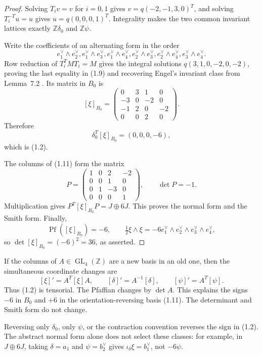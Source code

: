 \documentclass[11pt]{article}
\numberwithin{equation}{section}
\begin{document}
\begin{proof}
Solving $T_iv=v$ for $i=0,1$ gives
$v=q(-2,-1,3,0)^T$, and solving $T_i^{-T}u=u$ gives
$u=q(0,0,0,1)^T$.  Integrality makes the two common invariant lattices
exactly $\mathbb Z\delta_0$ and $\mathbb Z\psi$.

Write the coefficients of an alternating form in the order
\[
 e_1^\vee\wedge e_2^\vee, e_1^\vee\wedge e_3^\vee,
 e_1^\vee\wedge e_4^\vee, e_2^\vee\wedge e_3^\vee,
 e_2^\vee\wedge e_4^\vee, e_3^\vee\wedge e_4^\vee.
\]
Row reduction of $T_i^TMT_i=M$ gives the integral solutions
$q(3,1,0,-2,0,-2)$, proving the last equality in (1.9) and recovering
Engel's invariant class from Lemma~7.2 \cite[p.~17]{Engel}.  Its matrix in
$B_0$ is
\[
 [\xi]_{B_0}=
 \begin{pmatrix}
 0&3&1&0\\-3&0&-2&0\\-1&2&0&-2\\0&0&2&0
 \end{pmatrix}.                                                   \tag{1.14}
\]
Therefore
\[
       \delta_0^T[\xi]_{B_0}=(0,0,0,-6),
\]
which is (1.2).

The columns of (1.11) form the matrix
\[
 P=\begin{pmatrix}1&0&2&-2\\0&0&1&0\\0&1&-3&0\\0&0&0&1\end{pmatrix},
 \qquad \det P=-1.
\]
Multiplication gives $P^T[\xi]_{B_0}P=J\oplus6J$.  This proves the
normal form and the Smith form.  Finally,
\[
 \operatorname{Pf}([\xi]_{B_0})=-6,\qquad
 \tfrac12\xi\wedge\xi
   =-6e_1^\vee\wedge e_2^\vee\wedge e_3^\vee\wedge e_4^\vee,
\]
so $\det[\xi]_{B_0}=(-6)^2=36$, as asserted.
\end{proof}

\begin{remark}
If the columns of $A\in\operatorname{GL}_4(\mathbb Z)$ are a new basis in
an old one, then the simultaneous coordinate changes are
\[
 [\xi]'=A^T[\xi]A,\qquad [\delta]'=A^{-1}[\delta],\qquad
 [\psi]'=A^T[\psi].                                               \tag{1.15}
\]
Thus (1.2) is tensorial.  The Pfaffian changes by $\det A$.
This explains the signs $-6$ in $B_0$ and $+6$ in the
orientation-reversing basis (1.11). The determinant and Smith form do not change.

Reversing only
$\delta_0$, only $\psi$, or the contraction convention reverses the sign in
(1.2).  The abstract normal form alone does not select these classes: for
example, in $J\oplus6J$, taking $\delta=a_1$ and $\psi=b_2^\vee$ gives
$\iota_\delta\xi=b_1^\vee$, not $-6\psi$.
\end{remark}
\end{document}
